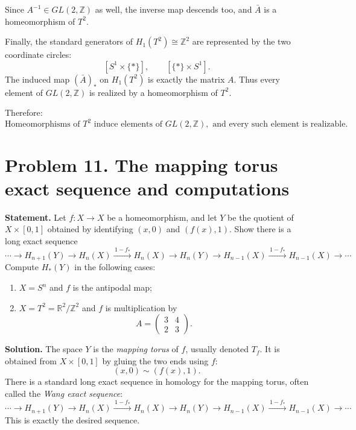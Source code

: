 \documentclass[12pt,a4paper]{article}
\theoremstyle{notespace}
\begin{document}
Since \(A^{-1}\in GL(2,\mathbb Z)\) as well, the inverse map descends too, and \(\bar A\) is a homeomorphism of \(T^2\).

Finally, the standard generators of \(H_1(T^2)\cong \mathbb Z^2\) are represented by the two coordinate circles:
\[
[S^1\times \{*\}],\qquad [\{*\}\times S^1].
\]
The induced map \((\bar A)_*\) on \(H_1(T^2)\) is exactly the matrix \(A\). Thus every element of \(GL(2,\mathbb Z)\) is realized by a homeomorphism of \(T^2\).

\medskip

Therefore:
\[
\boxed{\text{Homeomorphisms of }T^2\text{ induce elements of }GL(2,\mathbb Z),\text{ and every such element is realizable.}}
\]



\section{Problem 11. The mapping torus exact sequence and computations}

\textbf{Statement.}
Let \(f:X\to X\) be a homeomorphism, and let \(Y\) be the quotient of \(X\times [0,1]\) obtained by identifying \((x,0)\) and \((f(x),1)\). Show there is a long exact sequence
\[
\cdots \longrightarrow H_{n+1}(Y)\longrightarrow H_n(X)\xrightarrow{\,1-f_*\,} H_n(X)\longrightarrow H_n(Y)\longrightarrow H_{n-1}(X)\xrightarrow{\,1-f_*\,}H_{n-1}(X)\longrightarrow\cdots
\]
Compute \(H_*(Y)\) in the following cases:
\begin{enumerate}
	\item \(X=S^n\) and \(f\) is the antipodal map;
	\item \(X=T^2=\mathbb R^2/\mathbb Z^2\) and \(f\) is multiplication by
	\[
	A=\begin{pmatrix}3&4\\2&3\end{pmatrix}.
	\]
\end{enumerate}

\medskip

\textbf{Solution.}
The space \(Y\) is the \emph{mapping torus} of \(f\), usually denoted \(T_f\). It is obtained from \(X\times [0,1]\) by gluing the two ends using \(f\):
\[
(x,0)\sim (f(x),1).
\]
There is a standard long exact sequence in homology for the mapping torus, often called the \emph{Wang exact sequence}:
\[
\cdots \longrightarrow H_{n+1}(Y)\longrightarrow H_n(X)\xrightarrow{\,1-f_*\,} H_n(X)\longrightarrow H_n(Y)\longrightarrow H_{n-1}(X)\xrightarrow{\,1-f_*\,}H_{n-1}(X)\longrightarrow\cdots
\]
This is exactly the desired sequence.
\end{document}
